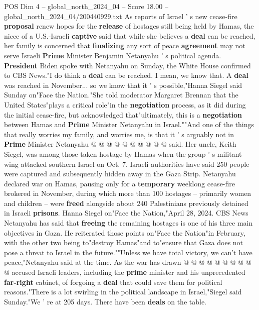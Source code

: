 \begin{textsample}{POS Dim 4 – global\_north\_2024\_04 – Score 18.00 – global\_north\_2024\_04/200440929.txt}  \label{ex:f4_pos_368}
As reports of Israel ' s new cease-fire \textbf{proposal} renew hopes for the \textbf{release} of hostages still being held by Hamas, the niece of a U.S.-Israeli \textbf{captive} said that while she believes a \textbf{deal} can be reached, her family is concerned that \textbf{finalizing} any sort of peace \textbf{agreement} may not serve Israeli \textbf{Prime} Minister Benjamin Netanyahu ' s political agenda. \textbf{President} Biden spoke with Netanyahu on Sunday, the White House confirmed to CBS News."I do think a \textbf{deal} can be reached.
I mean, we know that.
A \textbf{deal} was reached in November... so we know that it ' s possible,"Hanna Siegel said Sunday on"Face the Nation."She told moderator Margaret Brennan that the United States"plays a critical role"in the \textbf{negotiation} process, as it did during the initial cease-fire, but acknowledged that"ultimately, this is a \textbf{negotiation} between Hamas and \textbf{Prime} Minister Netanyahu in Israel.""And one of the things that really worries my family, and worries me, is that it ' s arguably not in \textbf{Prime} Minister Netanyahu @ @ @ @ @ @ @ @ @ @ said.
Her uncle, Keith Siegel, was among those taken hostage by Hamas when the group ' s militant wing attacked southern Israel on Oct. 7.
Israeli authorities have said 250 people were captured and subsequently hidden away in the Gaza Strip.
Netanyahu declared war on Hamas, pausing only for a \textbf{temporary} weeklong cease-fire brokered in November, during which more than 100 hostages -- primarily women and children -- were \textbf{freed} alongside about 240 Palestinians previously detained in Israeli \textbf{prisons}.
Hanna Siegel on"Face the Nation,"April 28, 2024.
CBS News Netanyahu has said that \textbf{freeing} the remaining hostages is one of his three main objectives in Gaza.
He reiterated those points on"Face the Nation"in February, with the other two being to"destroy Hamas"and to"ensure that Gaza does not pose a threat to Israel in the future.""Unless we have total victory, we can't have peace,"Netanyahu said at the time.
As the war has drawn @ @ @ @ @ @ @ @ @ @ accused Israeli leaders, including the \textbf{prime} minister and his unprecedented \textbf{far-right} cabinet, of forgoing a \textbf{deal} that could save them for political reasons."There is a lot swirling in the political landscape in Israel,"Siegel said Sunday."We ' re at 205 days.
There have been \textbf{deals} on the table.

\end{textsample}
